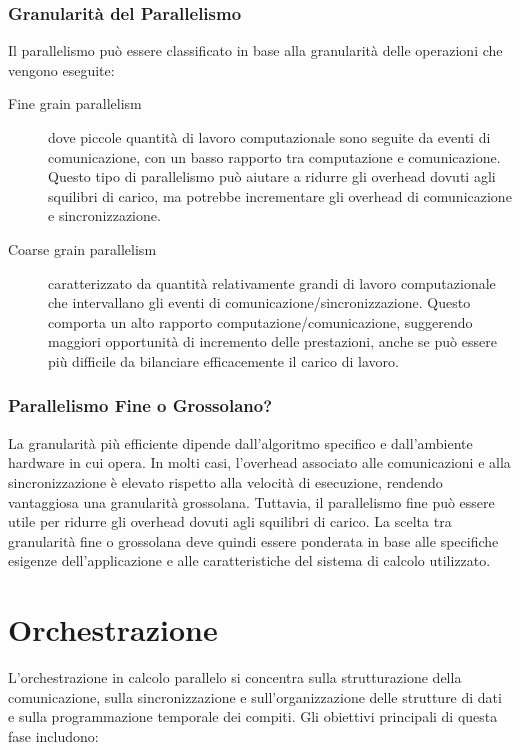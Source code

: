 \subsubsection{Granularità del Parallelismo}
Il parallelismo può essere classificato in base alla
granularità delle operazioni che vengono eseguite:
\begin{description}
    \item[Fine grain parallelism]
    dove piccole quantità di lavoro computazionale
    sono seguite da eventi di comunicazione, con un
    basso rapporto tra computazione e comunicazione.
    Questo tipo di parallelismo può aiutare a ridurre
    gli overhead dovuti agli squilibri di carico, ma
    potrebbe incrementare gli overhead di comunicazione
    e sincronizzazione.
    \item[Coarse grain parallelism] caratterizzato da
    quantità relativamente grandi di lavoro computazionale
    che intervallano gli eventi di
    comunicazione/sincronizzazione. Questo comporta
    un alto rapporto computazione/comunicazione,
    suggerendo maggiori opportunità di incremento delle
    prestazioni, anche se può essere più difficile
    da bilanciare efficacemente il carico di lavoro.
\end{description}

\subsubsection{Parallelismo Fine o Grossolano?}
La granularità più efficiente dipende dall'algoritmo
specifico e dall'ambiente hardware in cui opera. In molti
casi, l'overhead associato alle comunicazioni e alla
sincronizzazione è elevato rispetto alla velocità di
esecuzione, rendendo vantaggiosa una granularità
grossolana. Tuttavia, il parallelismo fine può essere
utile per ridurre gli overhead dovuti agli squilibri di
carico. La scelta tra granularità fine o grossolana deve
quindi essere ponderata in base alle specifiche esigenze
dell'applicazione e alle caratteristiche del sistema di
calcolo utilizzato.

\section{Orchestrazione}

L'orchestrazione in calcolo parallelo si concentra sulla
strutturazione della comunicazione, sulla sincronizzazione
e sull'organizzazione delle strutture di dati e sulla
programmazione temporale dei compiti. Gli obiettivi
principali di questa fase includono:

